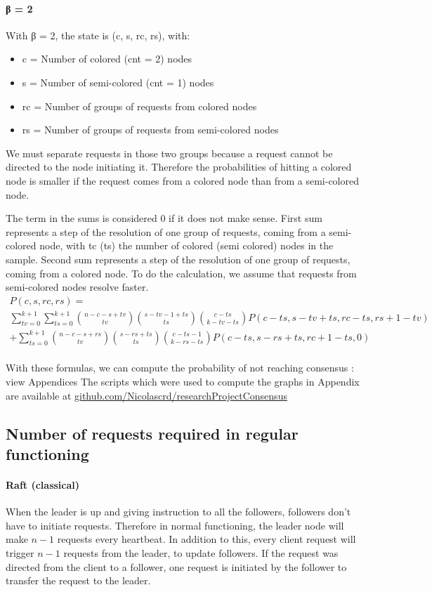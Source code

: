 \documentclass[11pt, twocolumn]{article}
\begin{document}
\paragraph{β = 2}
With β = 2, the state is (c, s, rc, rs), with:
\begin{itemize}
    \item c = Number of colored (cnt = 2) nodes
    \item s = Number of semi-colored (cnt = 1) nodes
    \item rc = Number of groups of requests from colored nodes
    \item rs = Number of groups of requests from semi-colored nodes
\end{itemize}

We must separate requests in those two groups because a request cannot be directed to the node initiating it.
Therefore the probabilities of hitting a colored node is smaller if the request comes from a colored node than from a semi-colored node.

The term in the sums is considered 0 if it does not make sense.
First sum represents a step of the resolution of one group of requests, coming from a semi-colored node, with tc (ts) the number of colored (semi colored) nodes in the sample.
Second sum represents a step of the resolution of one group of requests, coming from a colored node.
To do the calculation, we assume that requests from semi-colored nodes resolve faster.
\begin{multline*}
    P(c, s, rc, rs) = \\ \sum_{tv=0}^{k+1}\sum_{ts=0}^{k+1} {n-c-s+tv \choose tv}{s-tv-1+ts \choose ts}{c-ts \choose k-tv-ts}P(c-ts, s-tv+ts, rc-ts, rs+1-tv)
    \\ + \sum_{ts=0}^{k+1} {n-c-s+rs \choose tv}{s-rs+ts \choose ts}{c-ts-1 \choose k-rs-ts}P(c-ts, s-rs+ts, rc+1-ts, 0)
\end{multline*}
\\
With these formulas, we can compute the probability of not reaching consensus : view Appendices
The scripts which were used to compute the graphs in Appendix are available at \href{https://github.com/Nicolascrd/researchProjectConsensus}{github.com/Nicolascrd/researchProjectConsensus}

\subsection{Number of requests required in regular functioning}

\paragraph{Raft (classical)}
When the leader is up and giving instruction to all the followers, followers don't have to initiate requests.
Therefore in normal functioning, the leader node will make $n-1$ requests every heartbeat.
In addition to this, every client request will trigger $n-1$ requests from the leader, to update followers. If the request was directed from the client to a follower, one request is initiated
by the follower to transfer the request to the leader.
\end{document}
